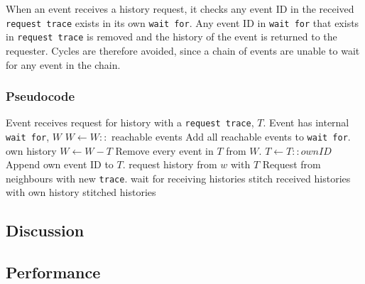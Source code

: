 \newpar When an event receives a history request, it checks any event ID in the received \texttt{request trace} exists in its own \texttt{wait for}. Any event ID in \texttt{wait for} that exists in \texttt{request trace} is removed and the history of the event is returned to the requester. 
Cycles are therefore avoided, since a chain of events are unable to wait for any event in the chain.


\subsubsection*{Pseudocode}
\begin{algorithmic}
	\State Event receives request for history with a \texttt{request trace}, $T$.
	\State Event has internal \texttt{wait for}, $W$
	\State
	\State $W\gets W::$ reachable events \Comment Add all reachable events to \texttt{wait for}.
	\Return own history
	\Else
	\State $W\gets W-T$ \Comment Remove every event in $T$ from $W$.
	\State $T\gets T::ownID$ \Comment Append own event ID to $T$.
	\State
	\State request history from $w$ with $T$ \Comment Request from neighbours with new \texttt{trace}.
	\EndFor
	\State wait for receiving histories
	\State stitch received histories with own history
	\State
	\Return stitched histories
	\EndIf
\end{algorithmic}

\subsection{Discussion} %
\subsection{Performance} %